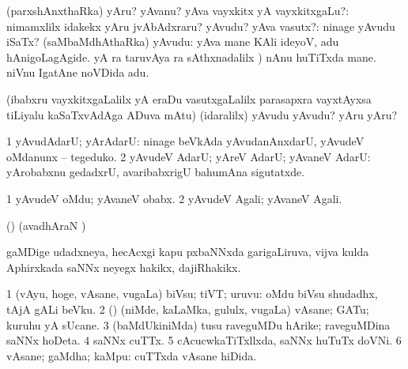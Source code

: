 {{{{{{\bentry
{} 
\gl{\sanA}
\expl{}
\bmng
\bnum
{} (parxshAnxthaRka) 
\banum
{} yAru? yAvanu? yAva vayxkitx yA vayxkitxgaLu?:  nimamxlilx idakekx yAru jvAbAdxraru? 
 yAvudu? yAva vasutx?:  ninage yAvudu iSaTx? 
\eanum
\numie
{} (saMbaMdhAthaRka) 
\banum
{} yAvudu:  yAva mane KAli ideyoV, adu hAnigoLagAgide. 
  yA  ra taruvAya  ra sAthxnadalilx \parx)  nAnu huTiTxda mane.  niVnu IgatAne noVDida adu. 
\eanum
\numie
\enum
\emng

\noindent
\gl{\pagu}
\expl{}
\bmng
  (ibabxru vayxkitxgaLalilx yA eraDu vasutxgaLalilx parasapxra vayxtAyxsa tiLiyalu kaSaTxvAdAga ADuva mAtu) (idaralilx) yAvudu yAvudu? yAru yAru? 
\emng
\eentry

\bentry 
{} 
\gl{\gu}
\expl{}
\bmng
\bnum
\num{1} yAvudAdarU; yArAdarU:  ninage beVkAda yAvudanAnxdarU, yAvudeV oMdanunx -- tegeduko. 
\num{2} yAvudeV AdarU; yAreV AdarU; yAvaneV AdarU:  yArobabxnu gedadxrU, avaribabxrigU bahumAna sigutatxde. 
\enum
\emng
\eentry

\bentry 
{} 
\gl{\sanA}
\expl{}
\bmng
\bnum
\num{1} yAvudeV oMdu; yAvaneV obabx. 
\num{2} yAvudeV Agali; yAvaneV Agali. 
\enum
\emng
\eentry

\bentry
{} 
\gl{\gu}
\expl{}
\bmng
(\pArxparx) (avadhAraN \parx)  
\emng
\eentry

\bentry
{} 
\gl{\sanA}
\expl{}
\bmng
{} 
\emng
\eentry

\bentry
{} 
\gl{\nA}
\expl{}
\bmng
gaMDige udadxneya, hecAcxgi kapu pxbaNNxda garigaLiruva, vijva  kulda Aphirxkada saNNx neyegx hakikx, dajiRhakikx. 
\emng
\eentry

\bentry
{} 
\gl{\nA}
\expl{}
\bmng
\bnum
\num{1} (vAyu, hoge, vAsane, \mo vugaLa) biVsu; tiVT; uruvu:  oMdu biVsu shudadhx, tAjA gALi beVku. 
\num{2} (\rUpa) (niMde, kaLaMka, gululx, \mo vugaLa) vAsane; GATu; kuruhu yA sUcane. 
\num{3} (baMdUkiniMda) tusu raveguMDu hArike; raveguMDina saNNx hoDeta. 
\num{4} saNNx cuTTx. 
\num{5} cAcucwkaTiTxllxda, saNNx huTuTx doVNi. 
\num{6} vAsane; gaMdha; kaMpu:  cuTTxda vAsane hiDida. 
\enum
\emng
\eentry

}}}}}}
